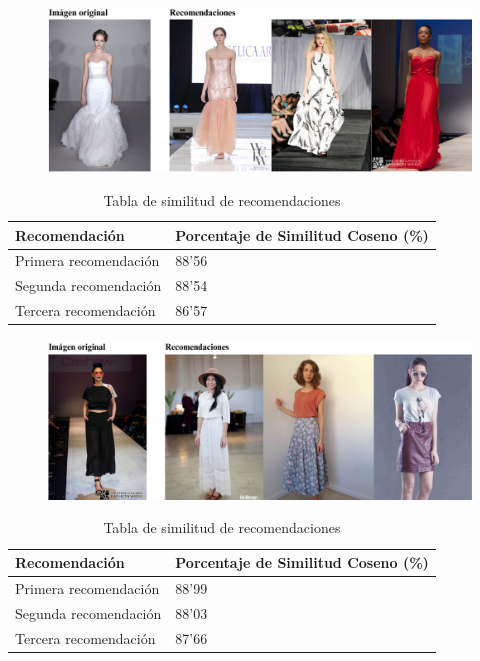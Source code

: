 \documentclass[12pt]{report} %
\begin{document}
	\begin{figure}[H]
		{\includegraphics[scale=0.6]{recomendacion4.png}}
	\end{figure}
	\begin{table}[H]
		\centering
		\caption{Tabla de similitud de recomendaciones}
		\begin{tabular}{ll}
				\textbf{Recomendación} & \textbf{Porcentaje de Similitud Coseno (\%)} \\
				\midrule
				Primera recomendación & 88'56 \\
				Segunda recomendación & 88'54 \\
				Tercera recomendación & 86'57 \\
				\bottomrule
		\end{tabular}
	\end{table}

	\begin{figure}[H]
		{\includegraphics[scale=0.6]{recomendacion3.png}}
	\end{figure}
	\begin{table}[H]
		\centering
		\caption{Tabla de similitud de recomendaciones}
		\begin{tabular}{ll}
				\textbf{Recomendación} & \textbf{Porcentaje de Similitud Coseno (\%)} \\
				\midrule
				Primera recomendación & 88'99 \\
				Segunda recomendación & 88'03 \\
				Tercera recomendación & 87'66 \\
				\bottomrule
		\end{tabular}
	\end{table}
\end{document}
